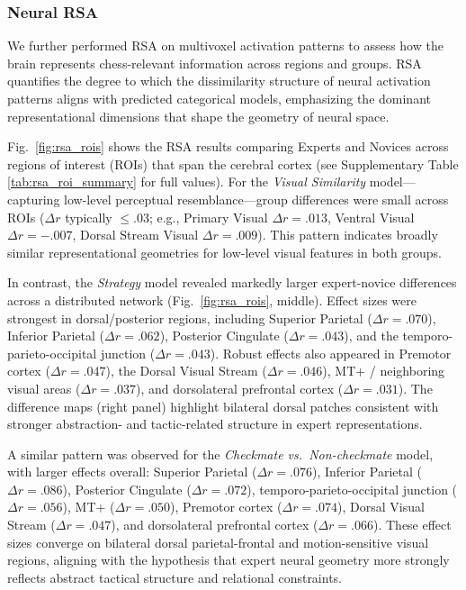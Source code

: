 \documentclass[preprint,12pt]{elsarticle}
\begin{document}
\subsubsection{Neural RSA}
We further performed RSA on multivoxel activation patterns to assess how the brain represents chess-relevant information across regions and groups. RSA quantifies the degree to which the dissimilarity structure of neural activation patterns aligns with predicted categorical models, emphasizing the dominant representational dimensions that shape the geometry of neural space.

Fig.~\ref{fig:rsa_rois} shows the RSA results comparing Experts and Novices across regions of interest (ROIs) that span the cerebral cortex (see Supplementary Table \ref{tab:rsa_roi_summary} for full values). For the \emph{Visual Similarity} model—capturing low-level perceptual resemblance—group differences were small across ROIs (\(\Delta r\) typically \(\le .03\); e.g., Primary Visual \(\Delta r = .013\), Ventral Visual \(\Delta r = -.007\), Dorsal Stream Visual \(\Delta r = .009\)). This pattern indicates broadly similar representational geometries for low-level visual features in both groups.

In contrast, the \emph{Strategy} model revealed markedly larger expert-novice differences across a distributed network (Fig.~\ref{fig:rsa_rois}, middle). Effect sizes were strongest in dorsal/posterior regions, including Superior Parietal (\(\Delta r = .070\)), Inferior Parietal (\(\Delta r = .062\)), Posterior Cingulate (\(\Delta r = .043\)), and the temporo-parieto-occipital junction (\(\Delta r = .043\)). Robust effects also appeared in Premotor cortex (\(\Delta r = .047\)), the Dorsal Visual Stream (\(\Delta r = .046\)), MT+ / neighboring visual areas (\(\Delta r = .037\)), and dorsolateral prefrontal cortex (\(\Delta r = .031\)). The difference maps (right panel) highlight bilateral dorsal patches consistent with stronger abstraction- and tactic-related structure in expert representations.

A similar pattern was observed for the \emph{Checkmate vs.\ Non-checkmate} model, with larger effects overall: Superior Parietal (\(\Delta r = .076\)), Inferior Parietal (\(\Delta r = .086\)), Posterior Cingulate (\(\Delta r = .072\)), temporo-parieto-occipital junction (\(\Delta r = .056\)), MT+ (\(\Delta r = .050\)), Premotor cortex (\(\Delta r = .074\)), Dorsal Visual Stream (\(\Delta r = .047\)), and dorsolateral prefrontal cortex (\(\Delta r = .066\)). These effect sizes converge on bilateral dorsal parietal-frontal and motion-sensitive visual regions, aligning with the hypothesis that expert neural geometry more strongly reflects abstract tactical structure and relational constraints.
\end{document}
